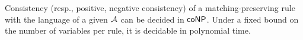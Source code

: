 \begin{theorem}
Consistency (resp., positive, negative consistency) of a matching-preserving rule with the language of a given \DVPA $\mathcal{A}$ can be decided in $\textsf{coNP}$.
Under a fixed bound on the number of variables per rule, it is decidable in polynomial time.
\end{theorem}










